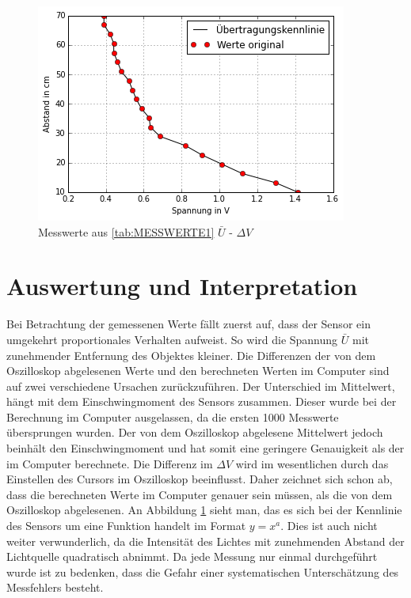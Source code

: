 \documentclass[12pt,oneside,a4paper]{report}
\begin{document}
\begin{figure}[H]
	\centering
	\includegraphics{media/durchschnittlicheMessergebnisse.png}
	\caption{Messwerte aus   \ref{tab:MESSWERTE1} $\bar{U}$  -  $\Delta V$}
	\label{img:MESSGRAFIK1}
\end{figure}
\section{Auswertung und Interpretation}
\label{chap:VERSUCH_1_AUSWERTUNG}
Bei Betrachtung der gemessenen Werte fällt zuerst auf, dass der Sensor ein umgekehrt proportionales Verhalten aufweist. So wird die Spannung $\bar{U}$ mit zunehmender Entfernung des Objektes kleiner. Die Differenzen der von dem Oszilloskop abgelesenen Werte und den berechneten Werten im Computer sind auf zwei verschiedene Ursachen zurückzuführen. Der Unterschied im Mittelwert, hängt mit dem Einschwingmoment des Sensors zusammen. Dieser wurde bei der Berechnung im Computer ausgelassen, da die ersten 1000 Messwerte übersprungen wurden. Der von dem Oszilloskop abgelesene Mittelwert jedoch beinhält den Einschwingmoment und hat somit eine geringere Genauigkeit als der im Computer berechnete.
Die Differenz im $\Delta V$ wird im wesentlichen durch das Einstellen des Cursors im Oszilloskop beeinflusst.
Daher zeichnet sich schon ab, dass die berechneten Werte im Computer genauer sein müssen, als die von dem Oszilloskop abgelesenen.
An Abbildung \ref{img:MESSGRAFIK1} sieht man, das es sich bei der Kennlinie des Sensors um eine Funktion handelt im Format $y = x^a$.
Dies ist auch nicht weiter verwunderlich, da die Intensität des Lichtes mit zunehmenden Abstand der Lichtquelle quadratisch abnimmt.
Da jede Messung nur einmal durchgeführt wurde ist zu bedenken, dass die Gefahr einer systematischen Unterschätzung des Messfehlers besteht.
\end{document}

